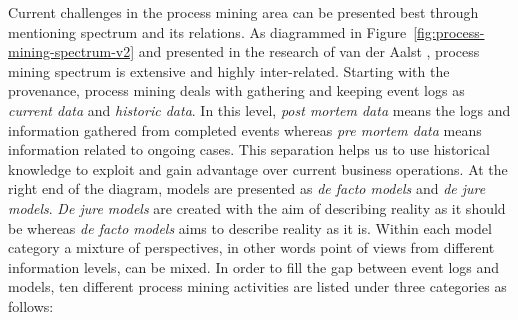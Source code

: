 Current challenges in the process mining area can be presented best through mentioning spectrum and its relations. As diagrammed in Figure~\ref{fig:process-mining-spectrum-v2} and presented in the research of van der Aalst \cite{van2011process}, process mining spectrum is extensive and highly inter-related. Starting with the provenance, process mining deals with gathering and keeping event logs as \textit{current data} and \textit{historic data}. In this level, \textit{post mortem data} means the logs and information gathered from completed events whereas \textit{pre mortem data} means information related to ongoing cases. This separation helps us to use historical knowledge to exploit and gain advantage over current business operations. At the right end of the diagram, models are presented as \textit{de facto models} and \textit{de jure models}. \textit{De jure models} are created with the aim of describing reality as it should be whereas \textit{de facto models} aims to describe reality as it is. Within each model category a mixture of perspectives, in other words point of views from different information levels, can be mixed. In order to fill the gap between event logs and models, ten different process mining activities are listed under three categories \cite{van2011process} as follows:
